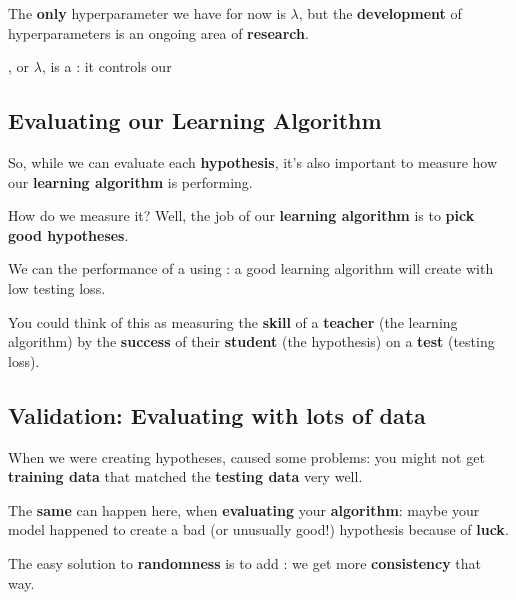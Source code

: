         The \textbf{only} hyperparameter we have for now is $\lambda$, but the \textbf{development} of hyperparameters is an ongoing area of \textbf{research}.\\
        
        \begin{concept}
            , or $\lambda$, is a : it controls our 
        \end{concept}
        
    \subsection{Evaluating our Learning Algorithm}
    
        So, while we can evaluate each \textbf{hypothesis}, it's also important to measure how our \textbf{learning algorithm} is performing.
        
        How do we measure it? Well, the job of our \textbf{learning algorithm} is to \textbf{pick good hypotheses}.\\
        
        \begin{concept}
            We can  the performance of a  using : a good learning algorithm will create  with low testing loss.
        \end{concept}
        
        You could think of this as measuring the \textbf{skill} of a \textbf{teacher} (the learning algorithm) by the \textbf{success} of their \textbf{student} (the hypothesis) on a \textbf{test} (testing loss).
        
    \subsection{Validation: Evaluating with lots of data}
    
        When we were creating hypotheses,  caused some problems: you might not get \textbf{training data} that matched the \textbf{testing data} very well.
        
        The \textbf{same} can happen here, when \textbf{evaluating} your \textbf{algorithm}: maybe your model happened to create a bad (or unusually good!) hypothesis because of \textbf{luck}.
        
        The easy solution to \textbf{randomness} is to add : we get more \textbf{consistency} that way.
        
